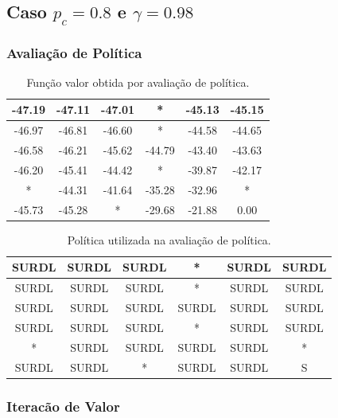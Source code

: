 \documentclass[a4paper,12pt]{article}
\begin{document}
\newpage

\subsection{Caso $p_c=0.8$ e $\gamma=0.98$}

\subsubsection{Avaliação de Política}

\begin{table}[htbp]
\centering
\begin{tabular}{|c|c|c|c|c|c|}
\hline
-47.19 & -47.11 & -47.01 & *     & -45.13 & -45.15 \\
\hline
-46.97 & -46.81 & -46.60 & *     & -44.58 & -44.65 \\
\hline
-46.58 & -46.21 & -45.62 & -44.79 & -43.40 & -43.63 \\
\hline
-46.20 & -45.41 & -44.42 & *     & -39.87 & -42.17 \\
\hline
*      & -44.31 & -41.64 & -35.28 & -32.96 & *     \\
\hline
-45.73 & -45.28 & *      & -29.68 & -21.88 & 0.00  \\
\hline
\end{tabular}
\caption{Função valor obtida por avaliação de política.}
\end{table}

\begin{table}[htbp]
\centering
\begin{tabular}{|c|c|c|c|c|c|}
\hline
SURDL & SURDL & SURDL & *     & SURDL & SURDL \\
\hline
SURDL & SURDL & SURDL & *     & SURDL & SURDL \\
\hline
SURDL & SURDL & SURDL & SURDL & SURDL & SURDL \\
\hline
SURDL & SURDL & SURDL & *     & SURDL & SURDL \\
\hline
*     & SURDL & SURDL & SURDL & SURDL & *     \\
\hline
SURDL & SURDL & *     & SURDL & SURDL & S     \\
\hline
\end{tabular}
\caption{Política utilizada na avaliação de política.}
\end{table}

\newpage

\subsubsection{Iteracão de Valor}
\end{document}
